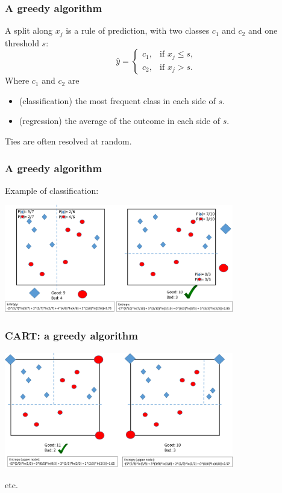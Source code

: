 \begin{frame}
\frametitle{A greedy algorithm}
A split along $x_j$ is a rule of prediction, with two classes $c_1$ and $c_2$ and one threshold $s$:
$$
\hat{y} = \left\{ 
\begin{array}{ll}
c_1, & \mbox{if } x_{j} \leq s,\\
c_2, & \mbox{if } x_{j} > s.
\end{array}\right.
$$
Where $c_1$ and $c_2$ are 
\begin{itemize}
\item (classification) the most frequent class in each side of $s$. 
\item (regression) the average of the outcome in each side of $s$.
\end{itemize}
Ties are often resolved at random.\\
\end{frame}
\begin{frame}
\frametitle{A greedy algorithm}
Example of classification:
\begin{center}
\includegraphics[width=10cm]{../../Graphs/Cart_Build.png}
\end{center}
\end{frame}
\begin{frame}
\frametitle{CART: a greedy algorithm}
\begin{center}
\includegraphics[width=10cm]{../../Graphs/Cart_Build2.png}
\end{center}
etc.
\end{frame}
